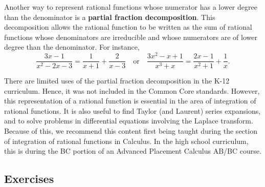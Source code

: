 \documentclass[
]{book}
\theoremstyle{definition}
\theoremstyle{definition}
\theoremstyle{definition}
\theoremstyle{definition}
\theoremstyle{remark}
\begin{document}
Another way to represent rational functions whose numerator has a lower degree than the denominator is a \textbf{partial fraction decomposition}. This decomposition allows the rational function to be written as the sum of rational functions whose denominators are irreducible and whose numerators are of lower degree than the denominator. For instance,
\[\frac{3x-1}{x^2-2x-3} = \frac{1}{x+1} + \frac{2}{x-3}\quad \mbox{or} \quad \frac{3x^2-x+1}{x^3+x} = \frac{2x-1}{x^2+1} + \frac{1}{x}.\]

There are limited uses of the partial fraction decomposition in the K-12 curriculum. Hence, it was not included in the Common Core standards. However, this representation of a rational function is essential in the area of integration of rational functions. It is also useful to find Taylor (and Laurent) series expansions, and to solve problems in differential equations involving the Laplace transform. Because of this, we recommend this content first being taught during the section of integration of rational functions in Calculus. In the high school curriculum, this is during the BC portion of an Advanced Placement Calculus AB/BC course.

\hypertarget{exercises-34}{%
\subsection{Exercises}\label{exercises-34}}
\end{document}
